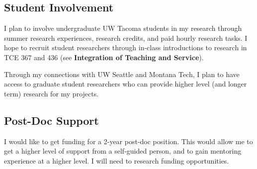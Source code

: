 \documentclass[10pt,letterpaper]{article}
\begin{document}
\subsection*{Student Involvement}
I plan to involve undergraduate UW Tacoma students in my research through summer research experiences, research credits, and paid hourly research tasks.
I hope to recruit student researchers through in-class introductions to research in TCE 367 and 436 (see \textbf{Integration of Teaching and Service}).

Through my connections with UW Seattle and Montana Tech, I plan to have access to graduate student researchers who can provide higher level (and longer term) research for my projects.

\subsection*{Post-Doc Support}
I would like to get funding for a 2-year post-doc position. 
This would allow me to get a higher level of support from a self-guided person, and to gain mentoring experience at a higher level.
I will need to research funding opportunities.
\end{document}
